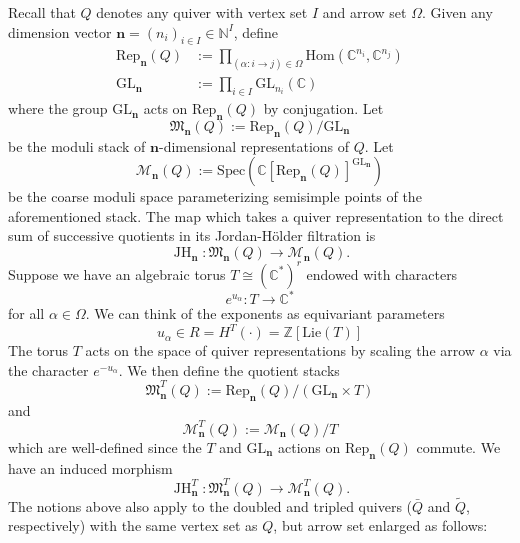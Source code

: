 \documentclass{amsart}
\def\GL{\mathrm{GL}}
\def\BC{{\mathbb{C}}}
\def\BZ{{\mathbb{Z}}}
\DeclareMathOperator{\JH}{\mathrm{JH}}
\def\nn{{\mathbb{N}^I}}
\def\bn{{\boldsymbol{n}}}
\def\Spec{\text{Spec}}
\def\edge{\Omega}
\def\dQ{\bar{Q}}
\def\tQ{\tilde{Q}}
\def\point{(\cdot)}
\begin{document}
Recall that $Q$ denotes any quiver with vertex set $I$ and arrow set $\edge$. Given any dimension vector $\bn = (n_i)_{i \in I}\in \nn$, define 
\begin{align*}
\mathrm{Rep}_{\bn}(Q) &:= \prod_{(\alpha : i \rightarrow j )\in \edge} \mathrm{Hom}(\BC^{n_i},\BC^{n_j}) \\ 
\GL_{\bn} &:= \prod_{i \in I} \GL_{n_i}(\BC)\end{align*} 
where the group $\GL_{\bn}$ acts on $\mathrm{Rep}_{\bn}(Q)$ by conjugation. Let 
\[\mathfrak{M}_{\bn}(Q) := \mathrm{Rep}_{\bn}(Q)/\GL_{\bn} \] 
be the moduli stack of $\bn$-dimensional representations of $Q$. Let 
\[\mathcal{M}_{\bn}(Q) := \Spec \left(\BC[\mathrm{Rep}_{\bn}(Q)]^{\GL_{\bn}} \right) \] 
be the coarse moduli space parameterizing semisimple points of the aforementioned stack. The map which takes a quiver representation to the direct sum of successive quotients in its Jordan-H\"older filtration is
\[ 
\JH_{\bn} \colon \mathfrak{M}_{\bn}(Q) \rightarrow \mathcal{M}_{\bn}(Q).
\]
Suppose we have an algebraic torus $T \cong (\BC^*)^r$ endowed with characters
\begin{equation}
\label{eqn:elementary character}
e^{u_\alpha} : T \rightarrow \BC^*
\end{equation}
for all $\alpha \in \edge$. We can think of the exponents as equivariant parameters
\begin{equation}
\label{eqn:equivariant parameter}
u_\alpha \in R= H^T\point = \BZ[\text{Lie}(T)]
\end{equation}
The torus $T$ acts on the space of quiver representations by scaling the arrow $\alpha$ via the character $e^{-u_{\alpha}}$. We then define the quotient stacks
\[ \mathfrak{M}_{\bn}^{T}(Q) := \mathrm{Rep}_{\bn}(Q)/(\GL_{\bn} \times T) \] 
and
\[ \mathcal{M}^{T}_{\bn}(Q) := \mathcal{M}_{\bn}(Q)/T\] 
which are well-defined since the $T$ and $\GL_{\bn}$ actions on $\mathrm{Rep}_{\bn}(Q)$ commute. We have an induced morphism
\begin{equation}
\label{eqn:semisimplification}
\JH^{T}_{\bn} \colon \mathfrak{M}^{T}_{\bn}(Q) \rightarrow \mathcal{M}^{T}_{\bn}(Q). 
\end{equation}
The notions above also apply to the doubled and tripled quivers ($\dQ$ and $\tQ$, respectively) with the same vertex set as $Q$, but arrow set enlarged as follows:

\medskip 
\end{document}
